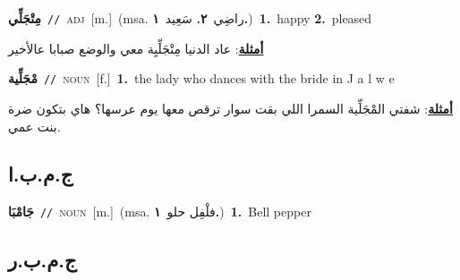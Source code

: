 \documentclass[10pt,a4paper,twoside]{article} %
\begin{document}
\begin{multicols}{2}
{\setlength\topsep{0pt}\textbf{\foreignlanguage{arabic}{مِتْجَلِّي}}\ {\color{gray}\texttt{//}\color{black}}\ \textsc{adj}\ [m.]\ \color{gray}(msa. \foreignlanguage{arabic}{راضِي}~\foreignlanguage{arabic}{\textbf{٢.}}  \foreignlanguage{arabic}{سَعِيد}~\foreignlanguage{arabic}{\textbf{١.}})\color{black}\ \textbf{1.}~happy  \textbf{2.}~pleased\  \begin{flushright}\color{gray}\foreignlanguage{arabic}{\textbf{\underline{\foreignlanguage{arabic}{أمثلة}}}: عاد الدنيا مِتْجَلِّيِة معي والوضع صبابا عالأخير}\end{flushright}\color{black}} \vspace{2mm}

{\setlength\topsep{0pt}\textbf{\foreignlanguage{arabic}{مْجَلِّية}}\ {\color{gray}\texttt{//}\color{black}}\ \textsc{noun}\ [f.]\ \textbf{1.}~the lady who dances with the bride in J a l w e\  \begin{flushright}\color{gray}\foreignlanguage{arabic}{\textbf{\underline{\foreignlanguage{arabic}{أمثلة}}}: شفتي المْجَلِّية السمرا اللي بقت سوار ترقص معها يوم عرسها؟ هاي بتكون ضرة بنت عمي.}\end{flushright}\color{black}} \vspace{2mm}

\vspace{-3mm}
\subsection*{\color{blue}\foreignlanguage{arabic}{ج.م.ب.ا}\color{blue}{ (ntws)}} 

{\setlength\topsep{0pt}\textbf{\foreignlanguage{arabic}{جَامْبَا}}\ {\color{gray}\texttt{//}\color{black}}\ \textsc{noun}\ [m.]\ \color{gray}(msa. \foreignlanguage{arabic}{فلْفِل حلو}~\foreignlanguage{arabic}{\textbf{١.}})\color{black}\ \textbf{1.}~Bell pepper\ } \vspace{2mm}

\vspace{-3mm}
\subsection*{\color{blue}\foreignlanguage{arabic}{ج.م.ب.ر}\color{blue}{ (ntws)}} 


\end{multicols}
\end{document}
